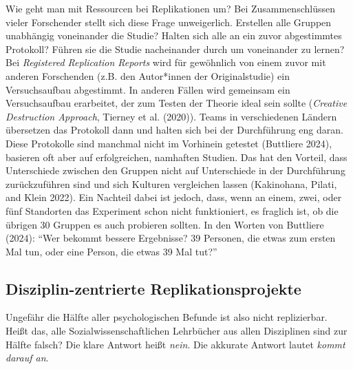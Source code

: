 \documentclass[
  letterpaper,
  DIV=11,
  numbers=noendperiod]{scrreprt}
\begin{document}
\begin{tcolorbox}[enhanced jigsaw, title=\textcolor{quarto-callout-note-color}{\faInfo}\hspace{0.5em}{Effiziente Nutzung von Ressourcen?}, colbacktitle=quarto-callout-note-color!10!white, rightrule=.15mm, titlerule=0mm, left=2mm, bottomrule=.15mm, arc=.35mm, leftrule=.75mm, toprule=.15mm, opacityback=0, breakable, bottomtitle=1mm, colframe=quarto-callout-note-color-frame, toptitle=1mm, opacitybacktitle=0.6, coltitle=black, colback=white]

Wie geht man mit Ressourcen bei Replikationen um? Bei Zusammenschlüssen
vieler Forschender stellt sich diese Frage unweigerlich. Erstellen alle
Gruppen unabhängig voneinander die Studie? Halten sich alle an ein zuvor
abgestimmtes Protokoll? Führen sie die Studie nacheinander durch um
voneinander zu lernen? Bei \emph{Registered Replication Reports} wird
für gewöhnlich von einem zuvor mit anderen Forschenden (z.B. den
Autor*innen der Originalstudie) ein Versuchsaufbau abgestimmt. In
anderen Fällen wird gemeinsam ein Versuchsaufbau erarbeitet, der zum
Testen der Theorie ideal sein sollte (\emph{Creative Destruction
Approach}, Tierney et al. (2020)). Teams in verschiedenen Ländern
übersetzen das Protokoll dann und halten sich bei der Durchführung eng
daran. Diese Protokolle sind manchmal nicht im Vorhinein getestet
(Buttliere 2024), basieren oft aber auf erfolgreichen, namhaften
Studien. Das hat den Vorteil, dass Unterschiede zwischen den Gruppen
nicht auf Unterschiede in der Durchführung zurückzuführen sind und sich
Kulturen vergleichen lassen (Kakinohana, Pilati, and Klein 2022). Ein
Nachteil dabei ist jedoch, dass, wenn an einem, zwei, oder fünf
Standorten das Experiment schon nicht funktioniert, es fraglich ist, ob
die übrigen 30 Gruppen es auch probieren sollten. In den Worten von
Buttliere (2024): ``Wer bekommt bessere Ergebnisse? 39 Personen, die
etwas zum ersten Mal tun, oder eine Person, die etwas 39 Mal tut?''

\end{tcolorbox}

\subsection{Disziplin-zentrierte
Replikationsprojekte}\label{disziplin-zentrierte-replikationsprojekte}

Ungefähr die Hälfte aller psychologischen Befunde ist also nicht
replizierbar. Heißt das, alle Sozialwissenschaftlichen Lehrbücher aus
allen Disziplinen sind zur Hälfte falsch? Die klare Antwort heißt
\emph{nein}. Die akkurate Antwort lautet \emph{kommt darauf an}.
\end{document}
